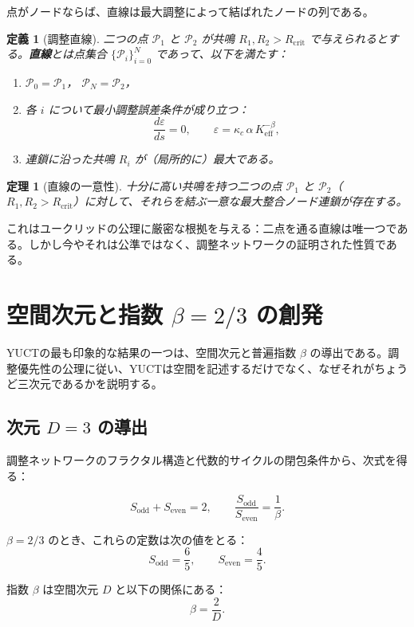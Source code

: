 \documentclass[12pt,a4paper]{article}
\newtheorem{theorem}{定理}
\newtheorem{definition}{定義}
\newcommand{\Keff}{K_{\mathrm{eff}}}
\newcommand{\kappac}{\kappa_c}
\newcommand{\eps}{\varepsilon}
\newcommand{\betaf}{\beta}
\newcommand{\Sodd}{S_{\mathrm{odd}}}
\newcommand{\Seven}{S_{\mathrm{even}}}
\newcommand{\Rcrit}{R_{\mathrm{crit}}}
\newcommand{\calP}{\mathcal{P}}
\begin{document}
	点がノードならば、直線は最大調整によって結ばれたノードの列である。
	
	\begin{definition}[調整直線]
		二つの点 \(\calP_1\) と \(\calP_2\) が共鳴 \(R_1, R_2 > \Rcrit\) で与えられるとする。\textbf{直線}とは点集合 \(\{\calP_i\}_{i=0}^{N}\) であって、以下を満たす：
		\begin{enumerate}
			\item \(\calP_0 = \calP_1\)， \(\calP_N = \calP_2\)，
			\item 各 \(i\) について最小調整誤差条件が成り立つ：
			\[
			\frac{d\eps}{ds} = 0, \qquad \eps = \kappac\,\alpha\,\Keff^{-\betaf},
			\]
			\item 連鎖に沿った共鳴 \(R_i\) が（局所的に）最大である。
		\end{enumerate}
	\end{definition}
	
	\begin{theorem}[直線の一意性]
		十分に高い共鳴を持つ二つの点 \(\calP_1\) と \(\calP_2\)（\(R_1, R_2 > \Rcrit\)）に対して、それらを結ぶ一意な最大整合ノード連鎖が存在する。
	\end{theorem}
	
	これはユークリッドの公理に厳密な根拠を与える：二点を通る直線は唯一つである。しかし今やそれは公準ではなく、調整ネットワークの証明された性質である。
	
	\section{空間次元と指数 \(\betaf = 2/3\) の創発}
	
	YUCTの最も印象的な結果の一つは、空間次元と普遍指数 \(\betaf\) の導出である。調整優先性の公理に従い、YUCTは空間を記述するだけでなく、なぜそれがちょうど三次元であるかを説明する。
	
	\subsection{次元 \(D=3\) の導出}
	
	調整ネットワークのフラクタル構造と代数的サイクルの閉包条件から、次式を得る：
	
	\[
	\Sodd + \Seven = 2, \qquad \frac{\Sodd}{\Seven} = \frac{1}{\betaf}.
	\]
	
	\(\betaf = 2/3\) のとき、これらの定数は次の値をとる：
	\[
	\Sodd = \frac{6}{5}, \qquad \Seven = \frac{4}{5}.
	\]
	
	指数 \(\betaf\) は空間次元 \(D\) と以下の関係にある：
	\[
	\betaf = \frac{2}{D}.
	\]
	
\end{document}

